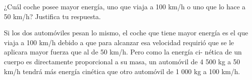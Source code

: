 ¿Cuál coche posee mayor energía, uno que viaja a 100 km/h o uno que lo hace
a 50 km/h? Justifica tu respuesta.

\begin{solutionbox}{2.5cm}
    Si los dos automóviles pesan lo mismo, el coche que tiene mayor energía es
    el que viaja a 100 km/h debido a que para alcanzar esa velocidad requirió
    que se le aplicara mayor fuerza que al de 50 km/h. Pero como la energía ci-
    nética de un cuerpo es directamente proporcional a su masa, un automóvil
    de 4 500 kg a 50 km/h tendrá más energía cinética que otro automóvil de
    1 000 kg a 100 km/h.
\end{solutionbox}
